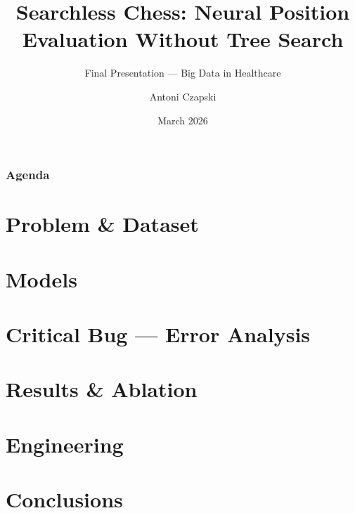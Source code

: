\documentclass{beamer}
\title[BDH Searchless Chess --- Final]{Searchless Chess: Neural Position Evaluation Without Tree Search}
\subtitle{Final Presentation --- Big Data in Healthcare}
\author{Antoni Czapski}
\institute[AGH UST]{AGH University of Science and Technology}
\date{March 2026}
\begin{document}
\frame{\titlepage}

\begin{frame}
\frametitle{Agenda}
\tableofcontents
\end{frame}

\section{Problem \& Dataset}
\section{Models}
\section{Critical Bug --- Error Analysis}
\section{Results \& Ablation}
\section{Engineering}
\section{Conclusions}
\end{document}

